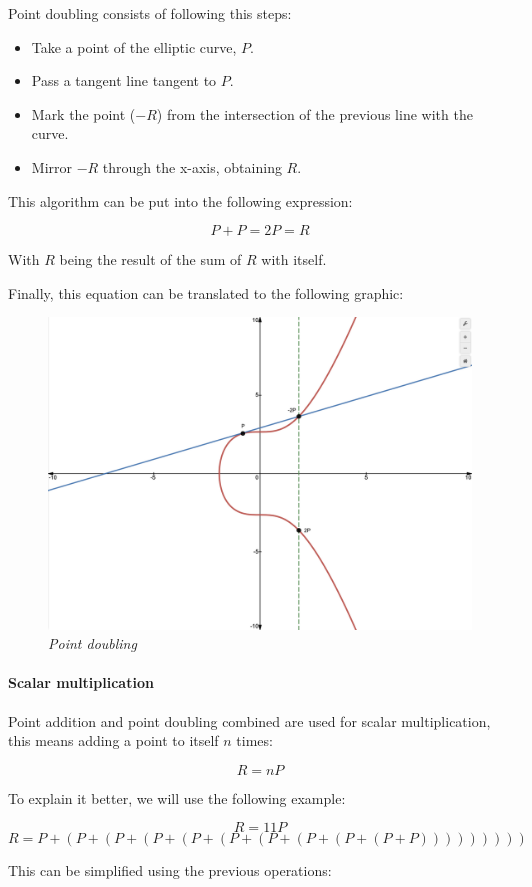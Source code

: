 \documentclass{article}
\newcommand\tab[1][1cm]{\hspace*{#1}}
\begin{document}
\tab Point doubling consists of following this steps:

\begin{itemize}
    \item Take a point of the elliptic curve, \(P\).
    \item Pass a tangent line tangent to \(P\).
    \item Mark the point (\(-R\)) from the intersection of the previous line with the curve.
    \item Mirror \(-R\) through the x-axis, obtaining \(R\).
\end{itemize}

This algorithm can be put into the following expression:

\[P + P = 2P = R\]

With \(R\) being the result of the sum of \(R\) with itself.

Finally, this equation can be translated to the following graphic:

\begin{figure}[H]
    \begin{center}
        \includegraphics[width=0.5 \textwidth]{images/point_doubling.png}
        \caption{\textit{Point doubling}}
    \end{center}
\end{figure}

\paragraph{Scalar multiplication}

\tab Point addition and point doubling combined are used for scalar multiplication, this means adding a point to itself \(n\) times:

\[R = nP\]

To explain it better, we will use the following example:

\[R = 11P\]
\[R = P + (P + (P + (P + (P + (P + (P + (P + (P + (P + P)))))))))\]

This can be simplified using the previous operations:
\end{document}
